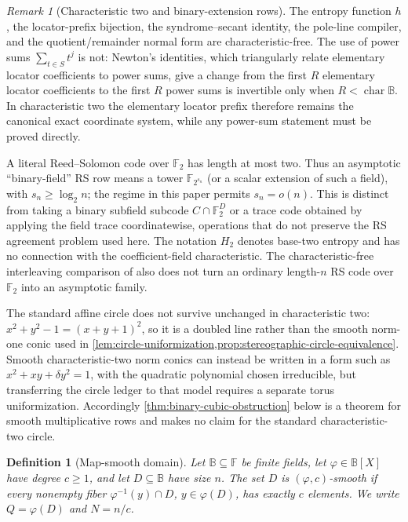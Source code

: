\documentclass[12pt,a4paper]{amsart}
\numberwithin{equation}{section}
\newtheorem{definition}[definition]{Definition}
\theoremstyle{remark}
\newtheorem{remark}[remark]{Remark}
\newcommand{\F}{\mathbb F}
\newcommand{\B}{\mathbb B}
\begin{document}
\begin{remark}[Characteristic two and binary-extension rows]
\label{rem:characteristic-two-rows}
The entropy function \(h\), the locator-prefix bijection, the
syndrome--secant identity, the pole-line compiler, and the
quotient/remainder normal form are characteristic-free.  The use of
power sums \(\sum_{t\in S}t^j\) is not: Newton's identities, which triangularly relate elementary
locator coefficients to power sums, give a change from the first \(R\)
elementary locator coefficients to the first \(R\) power sums is
invertible only when \(R<\operatorname{char}\B\).  In characteristic two
the elementary locator prefix therefore remains the canonical exact
coordinate system, while any power-sum statement must be proved directly.

A literal Reed--Solomon code over \(\F_2\) has length at most two.  Thus an
asymptotic ``binary-field'' RS row means a tower
\(\F_{2^{s_n}}\) (or a scalar extension of such a field), with
\(s_n\ge\log_2 n\); the regime in this paper permits
\(s_n=o(n)\).  This is distinct from taking a binary subfield subcode
\(C\cap\F_2^D\) or a trace code obtained by applying the field trace
coordinatewise, operations that do not preserve the RS agreement problem
used here.  The notation \(H_2\) denotes base-two entropy and has no
connection with the coefficient-field characteristic.  The
characteristic-free interleaving comparison of \cite{Jo26} also does not
turn an ordinary length-\(n\) RS code over \(\F_2\) into an asymptotic
family.

The standard affine circle does not survive unchanged in characteristic
two: \(x^2+y^2-1=(x+y+1)^2\), so it is a doubled line rather than the
smooth norm-one conic used in
\cref{lem:circle-uniformization,prop:stereographic-circle-equivalence}.
Smooth characteristic-two norm
conics can instead be written in a form such as
\(x^2+xy+\delta y^2=1\), with the quadratic polynomial chosen
irreducible, but transferring the circle ledger to that model requires a
separate torus uniformization.  Accordingly
\cref{thm:binary-cubic-obstruction} below is a theorem for smooth
multiplicative rows and makes no claim for the standard characteristic-two
circle.
\end{remark}

\begin{definition}[Map-smooth domain]\label{def:map-smooth}
Let \(\B\subseteq\F\) be finite fields, let \(\varphi\in\B[X]\) have
degree \(c\ge1\), and let \(D\subseteq\B\) have size \(n\).  The set
\(D\) is \((\varphi,c)\)-smooth if every nonempty fiber
\(\varphi^{-1}(y)\cap D\), \(y\in\varphi(D)\), has exactly \(c\)
elements.  We write \(Q=\varphi(D)\) and \(N=n/c\).
\end{definition}
\end{document}
